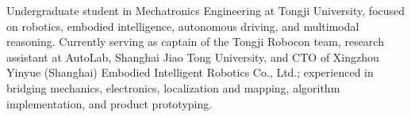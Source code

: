 
\begin{cvparagraph}
Undergraduate student in Mechatronics Engineering at Tongji University, focused on robotics, embodied intelligence, autonomous driving, and multimodal reasoning. Currently serving as captain of the Tongji Robocon team, research assistant at AutoLab, Shanghai Jiao Tong University, and CTO of Xingzhou Yinyue (Shanghai) Embodied Intelligent Robotics Co., Ltd.; experienced in bridging mechanics, electronics, localization and mapping, algorithm implementation, and product prototyping.
\end{cvparagraph}
